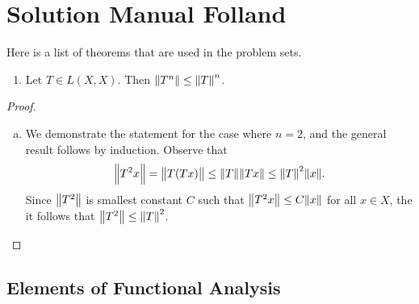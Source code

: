 \chapter{Solution Manual Folland}

Here is a list of theorems that are used in the problem sets.
\begin{proposition}
	\begin{enumerate}
		\item Let $ T \in L(X,X) $. Then $ \norm{T^n} \leq \norm{T}^n $.
	\end{enumerate}
\end{proposition}
\begin{proof}
	\begin{enumerate}[(a)]
		\item We demonstrate the statement for the case where $ n=2 $, and the general result follows by induction. Observe that
		\[ \norm{T^2x} = \norm{T(Tx)} \leq \norm{T} \norm{Tx} \leq \norm{T}^2\norm{x}. \]
		Since $ \norm{T^2} $ is smallest constant $ C $ such that $ \norm{T^2x}\leq C\norm{x} $ for all $ x\in X $, the it follows that $ \norm{T^2} \leq \norm{T}^2 $.
	\end{enumerate}
\end{proof}



\section{Elements of Functional Analysis}


